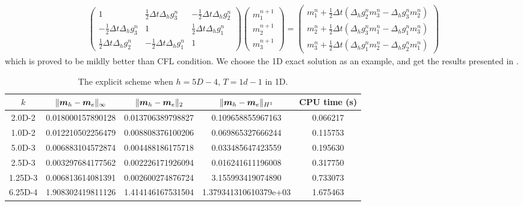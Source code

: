 \documentclass[preprint,times,3p]{elsarticle}
\def\m{\mbox{\boldmath $m$}}
\begin{document}
	\begin{align*}
	\begin{pmatrix}
	1&\frac12 \Delta t \Delta_hg_3^n&-\frac12 \Delta t \Delta_hg_2^n\\
	-\frac12 \Delta t\Delta_hg_3^n&1&\frac12 \Delta t\Delta_hg_1^n\\
	\frac12 \Delta t\Delta_hg_2^n&-\frac12 \Delta t \Delta_hg_1^n&1
	\end{pmatrix}\begin{pmatrix}
	m_1^{n+1}\\
	m_2^{n+1}\\
	m_3^{n+1}
	\end{pmatrix}=\begin{pmatrix}
	m_1^n+\frac12 \Delta t(\Delta_hg_2^n m_3^n-\Delta_hg_3^n m_2^n)\\
	m_2^n+\frac12 \Delta t(\Delta_hg_3^n m_1^n-\Delta_hg_1^n m_3^n)\\
	m_3^n+\frac12 \Delta t(\Delta_hg_1^n m_2^n-\Delta_hg_2^n m_1^n)
	\end{pmatrix}
	\end{align*}
	which is proved to be mildly better than CFL condition. We choose the 1D exact solution as an example, and get the results presented in .
    \begin{table}[htbp]
	\centering
	\caption{The explicit scheme when $h = 5D-4$, $T=1d-1$ in 1D.}\label{tab-a-E-4}
	\begin{tabular}{|c|c|c|c|c|}
		\hline
		$k$ & $\|\m_h-\m_e\|_\infty$ & $\|\m_h-\m_e\|_2$ &$\|\m_h-\m_e\|_{H^1}$ & CPU time (s)\\
		\hline
		2.0D-2 & 0.018000157890128 &0.013706389798827&0.109658855967163&0.066217 \\
		1.0D-2 &0.012210502256479&0.008808376100206&0.069865327666244&0.115753 \\
		5.0D-3 &0.006883104572874&0.004488186175718&0.033485647423559&0.195630\\
		2.5D-3 &0.003297684177562&0.002226171926094&0.016241611196008&0.317750\\
		1.25D-3 &0.006813614081391&0.002600274876724&3.155993419074890&0.733073\\
		6.25D-4 &1.908302419811126 &1.414146167531504&1.379341310610379e+03&1.675463\\
		\hline
	\end{tabular}
\end{table}
\end{document}
